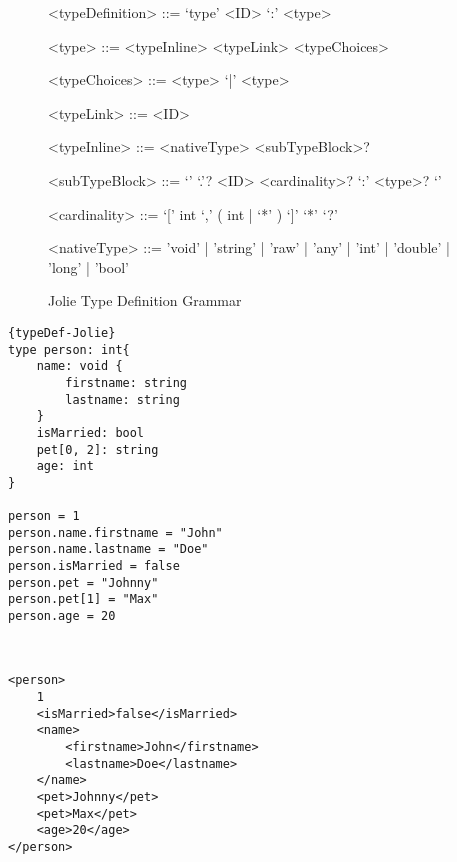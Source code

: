 \begin{figure}
	\begin{framed}
		\begin{grammar}
			<typeDefinition> ::= `type' <ID> `:' <type>

			<type> ::= <typeInline>
			\alt <typeLink>
			\alt <typeChoices>

			<typeChoices> ::= <type> `|' <type>

			<typeLink> ::= <ID>

			<typeInline> ::= <nativeType> <subTypeBlock>?

			<subTypeBlock> ::= `{' `.'? <ID> <cardinality>? `:' <type>? `}'

			<cardinality> ::= `[' int `,' ( int | `*' ) `]'
			\alt `*'
			\alt `?'

			<nativeType> ::= 'void' | 'string' | 'raw' | 'any' | 'int' | 'double' | 'long' | 'bool'
		\end{grammar}
	\end{framed}
	\caption{Jolie Type Definition Grammar\protect\footnotemark}
	\label{fig:TypeDefinitonSyntax}
\end{figure}


\begin{listing}
\begin{sublisting}{\linewidth}

\lstset{language=Jolie,
	style=codeStyle
}
\begin{lstlisting}[frame=tlrb, caption= {Constructing a type and value in Jolie}, label={list:type-value}]{typeDef-Jolie}
type person: int{
	name: void {
		firstname: string
		lastname: string
	}
	isMarried: bool
	pet[0, 2]: string
	age: int
}

person = 1
person.name.firstname = "John"
person.name.lastname = "Doe"
person.isMarried = false
person.pet = "Johnny"
person.pet[1] = "Max"
person.age = 20
\end{lstlisting}
\end{sublisting}\\[2ex]
\begin{sublisting}{\linewidth}
\lstset{language=XML,
showspaces=false
}
\begin{lstlisting}[frame=tlrb, caption= {XML representation of ~\ref{list:type-value}}, label={list:type-value-xml}]
<person>
	1
	<isMarried>false</isMarried>
	<name>
		<firstname>John</firstname>
		<lastname>Doe</lastname>
	</name>
	<pet>Johnny</pet>
	<pet>Max</pet>
	<age>20</age>
</person>
\end{lstlisting}
\end{sublisting}
\caption{ Jolie type Example }
\label{list:TypeDefinitonUsage}
\end{listing}

\FloatBarrier